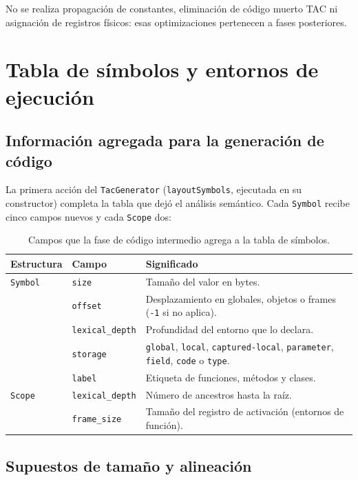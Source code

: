 \documentclass[11pt,a4paper]{article}
\begin{document}
No se realiza propagación de constantes, eliminación de código muerto TAC ni
asignación de registros físicos: esas optimizaciones pertenecen a fases
posteriores.

\section{Tabla de símbolos y entornos de ejecución}
\label{sec:simbolos}

\subsection{Información agregada para la generación de código}

La primera acción del \texttt{TacGenerator} (\texttt{layoutSymbols}, ejecutada
en su constructor) completa la tabla que dejó el análisis semántico. Cada
\texttt{Symbol} recibe cinco campos nuevos y cada \texttt{Scope} dos:

\begin{table}[H]
\centering
\small
\begin{tabular}{@{}llL{9.2cm}@{}}
\toprule
\textbf{Estructura} & \textbf{Campo} & \textbf{Significado} \\
\midrule
\texttt{Symbol} & \texttt{size} & Tamaño del valor en bytes. \\
 & \texttt{offset} & Desplazamiento en globales, objetos o frames
 (\texttt{-1} si no aplica). \\
 & \texttt{lexical\_depth} & Profundidad del entorno que lo declara. \\
 & \texttt{storage} & \texttt{global}, \texttt{local}, \texttt{captured-local},
 \texttt{parameter}, \texttt{field}, \texttt{code} o \texttt{type}. \\
 & \texttt{label} & Etiqueta de funciones, métodos y clases. \\
\texttt{Scope} & \texttt{lexical\_depth} & Número de ancestros hasta la raíz. \\
 & \texttt{frame\_size} & Tamaño del registro de activación (entornos de
 función). \\
\bottomrule
\end{tabular}
\caption{Campos que la fase de código intermedio agrega a la tabla de símbolos.}
\end{table}

\subsection{Supuestos de tamaño y alineación}
\end{document}
